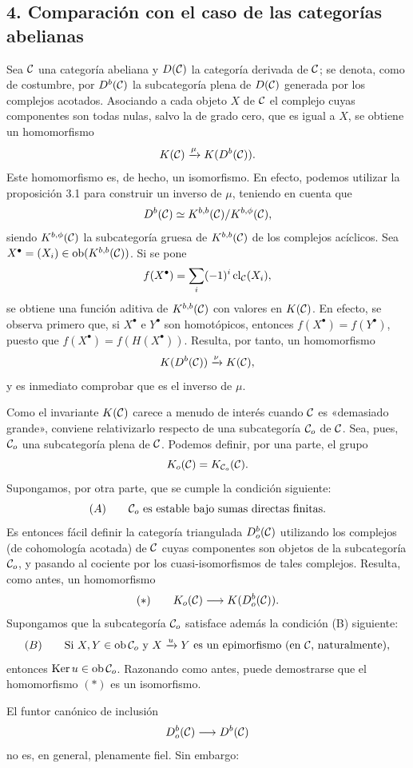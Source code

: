 \subsection*{4. Comparación con el caso de las categorías abelianas}

Sea $\mathcal C$ una categoría abeliana y $D(\mathcal C)$ la categoría derivada de $\mathcal C$; se denota, como de costumbre, por $D^b(\mathcal C)$ la subcategoría plena de $D(\mathcal C)$ generada por los complejos acotados. Asociando a cada objeto $X$ de $\mathcal C$ el complejo cuyas componentes son todas nulas, salvo la de grado cero, que es igual a $X$, se obtiene un homomorfismo
\[
K(\mathcal C)\xrightarrow{\mu}K(D^b(\mathcal C)).
\]
Este homomorfismo es, de hecho, un isomorfismo. En efecto, podemos utilizar la proposición 3.1 para construir un inverso de $\mu$, teniendo en cuenta que
\[
D^b(\mathcal C)\simeq K^{b,b}(\mathcal C)/K^{b,\phi}(\mathcal C),
\]
siendo $K^{b,\phi}(\mathcal C)$ la subcategoría gruesa de $K^{b,b}(\mathcal C)$ de los complejos acíclicos. Sea $X^\bullet=(X_i)\in\operatorname{ob}(K^{b,b}(\mathcal C))$. Si se pone
\[
f(X^\bullet)=\sum_i(-1)^i\operatorname{cl}_{\mathcal C}(X_i),
\]
se obtiene una función aditiva de $K^{b,b}(\mathcal C)$ con valores en $K(\mathcal C)$. En efecto, se observa primero que, si $X^\bullet$ e $Y^\bullet$ son homotópicos, entonces $f(X^\bullet)=f(Y^\bullet)$, puesto que $f(X^\bullet)=f(H(X^\bullet))$. Resulta, por tanto, un homomorfismo
\[
K(D^b(\mathcal C))\xrightarrow{\nu}K(\mathcal C),
\]
y es inmediato comprobar que es el inverso de $\mu$.

Como el invariante $K(\mathcal C)$ carece a menudo de interés cuando $\mathcal C$ es «demasiado grande», conviene relativizarlo respecto de una subcategoría $\mathcal C_o$ de $\mathcal C$. Sea, pues, $\mathcal C_o$ una subcategoría plena de $\mathcal C$. Podemos definir, por una parte, el grupo
\[
K_o(\mathcal C)=K_{\mathcal C_o}(\mathcal C).
\]
Supongamos, por otra parte, que se cumple la condición siguiente:
\[
(A)\qquad \mathcal C_o\text{ es estable bajo sumas directas finitas.}
\]
Es entonces fácil definir la categoría triangulada $D_o^b(\mathcal C)$ utilizando los complejos (de cohomología acotada) de $\mathcal C$ cuyas componentes son objetos de la subcategoría $\mathcal C_o$, y pasando al cociente por los cuasi-isomorfismos de tales complejos. Resulta, como antes, un homomorfismo
\[
(*)\qquad K_o(\mathcal C)\longrightarrow K(D_o^b(\mathcal C)).
\]
Supongamos que la subcategoría $\mathcal C_o$ satisface además la condición (B) siguiente:
\[
(B)\qquad
\text{Si }X,Y\in\operatorname{ob}\mathcal C_o\text{ y }X\xrightarrow{u}Y
\text{ es un epimorfismo (en }\mathcal C\text{, naturalmente)},
\]
entonces $\operatorname{Ker}u\in\operatorname{ob}\mathcal C_o$. Razonando como antes, puede demostrarse que el homomorfismo $(*)$ es un isomorfismo.

El funtor canónico de inclusión
\[
D_o^b(\mathcal C)\longrightarrow D^b(\mathcal C)
\]
no es, en general, plenamente fiel. Sin embargo:
